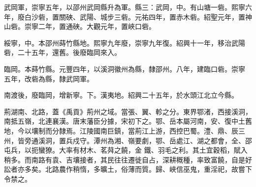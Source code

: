 \begin{pinyinscope}
 武岡軍，崇寧五年，以邵州武岡縣升為軍。縣三：武岡，中。有山塘一砦。熙寧六年，廢白沙砦，置關硤、武陽、城步三砦。元祐四年，置赤木砦。紹聖元年，置神山砦。崇寧二年，置通硤。大觀元年，置峽口砦。



 綏寧，中。本邵州蒔竹縣地。熙寧九年廢，崇寧九年復。紹興十一年，移治武陽砦，二十五年，還舊。後廢臨岡來入。



 臨岡。本蒔竹縣。元豐四年，以溪洞徽州為縣，隸邵州。八年，建臨口砦。崇寧
 五年，改砦為縣，隸武岡軍。



 南渡後，廢臨岡，增新寧。下。漢夷地。紹興二十五年，於水頭江北立今縣。



 荊湖南、北路，蓋《禹貢》荊州之域。當張、翼、軫之分。東界鄂渚，西接溪洞，南抵五嶺，北連襄漢。唐末藩臣分據，宋初下之。鄂、岳本屬河南，安、復中土舊地，今以壤制而分隸焉。江陵國南巨鎮，當荊江上游，西控巴蜀。澧、鼎、辰三州，皆旁通溪洞，置兵戍守。潭州為湘、嶺要劇，鄂、岳處江、湖之都會，全、邵屯兵，以扼蠻獠。大率有材木、茗荈之饒，金
 鐵、羽毛之利。其土宜穀稻，賦入稍多。而南路有袁、吉壤接者，其民往往遷徙自占，深耕穊種，率致富饒，自是好訟者亦多矣。北路農作稍惰，多曠土，俗薄而質。歸、峽信巫鬼，重淫祀，故嘗下令禁之。



\end{pinyinscope}